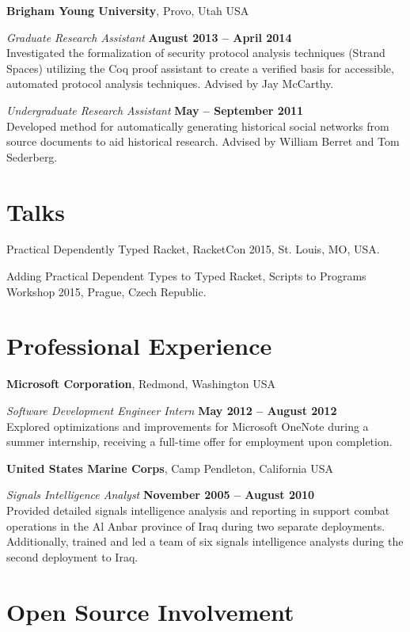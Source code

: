 \documentclass[margin,line]{res}
\begin{document}
\begin{resume}
{\bf Brigham Young University}, Provo, Utah USA

\vspace{-.3cm}

{\em Graduate Research Assistant} \hfill {\bf August 2013 -- April
  2014}\\ Investigated the formalization of security protocol analysis
techniques (Strand Spaces) utilizing the Coq proof assistant to create
a verified basis for accessible, automated protocol analysis
techniques. Advised by Jay McCarthy.

{\em Undergraduate Research Assistant} \hfill {\bf May -- September
  2011}\\ Developed method for automatically generating historical
social networks from source documents to aid historical
research. Advised by William Berret and Tom Sederberg.

\section{\sc Talks}
Practical Dependently Typed Racket, RacketCon 2015, St. Louis, MO, USA.

Adding Practical Dependent Types to Typed Racket, Scripts to Programs Workshop 2015, Prague, Czech Republic.

\section{\sc Professional Experience}
{\bf Microsoft Corporation}, Redmond, Washington USA

\vspace{-.3cm}
{\em Software Development Engineer Intern} \hfill {\bf May 2012 -- August 2012}\\
Explored optimizations and improvements for Microsoft OneNote during a
summer internship, receiving a full-time offer for employment upon completion.

{\bf United States Marine Corps}, Camp Pendleton, California USA

\vspace{-.3cm}
{\em Signals Intelligence Analyst} \hfill {\bf November 2005 -- August 2010}\\
Provided detailed signals intelligence analysis and reporting in
support combat operations in the Al Anbar province of Iraq during two
separate deployments. Additionally, trained and led a team of six
signals intelligence analysts during the second deployment to Iraq.

\section{\sc Open Source Involvement}


\end{resume}
\end{document}
